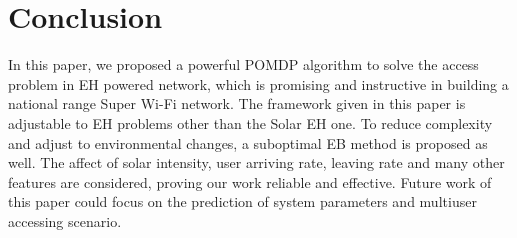 \documentclass[conference]{IEEEtran}
\begin{document}
\section{Conclusion}
In this paper, we proposed a powerful POMDP algorithm to solve the access problem in EH powered network,
which is promising and instructive in building a national range Super Wi-Fi network.
The framework given in this paper is adjustable to EH problems other than the Solar EH one.
To reduce complexity and adjust to environmental changes, a suboptimal EB method is proposed as well.
The affect of solar intensity, user arriving rate, leaving rate and many other features are considered,
proving our work reliable and effective.
Future work of this paper could focus on the prediction of system parameters and multiuser accessing scenario.


\end{document}
